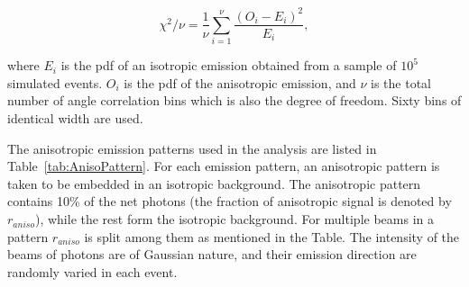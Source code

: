 \begin{equation}
\chi^2/\nu = \frac{1}{\nu} \sum^{\nu}_{i=1} \frac{(O_i - E_i)^2}{E_i},
\label{redchi2}
\end{equation}

where $E_i$ is the pdf of an isotropic emission obtained from a sample of $10^5$ simulated events. 
$O_i$ is the pdf of the anisotropic emission, and $\nu$ is the total number of angle correlation bins 
which is also the degree of freedom. Sixty bins of identical width are used.



%
%


The anisotropic emission patterns used in the analysis are listed 
in Table~\ref{tab:AnisoPattern}. For each emission pattern,  an anisotropic pattern is taken to be embedded 
in an isotropic background. The anisotropic pattern contains  
10\% of the net photons (the fraction of anisotropic signal is denoted by $r_{aniso}$),
while the rest form the isotropic background. For 
multiple beams in a pattern $r_{aniso}$ is split among them 
as mentioned in the Table. The intensity of the beams of photons are of 
Gaussian nature, and their emission direction are 
randomly varied in each event.


